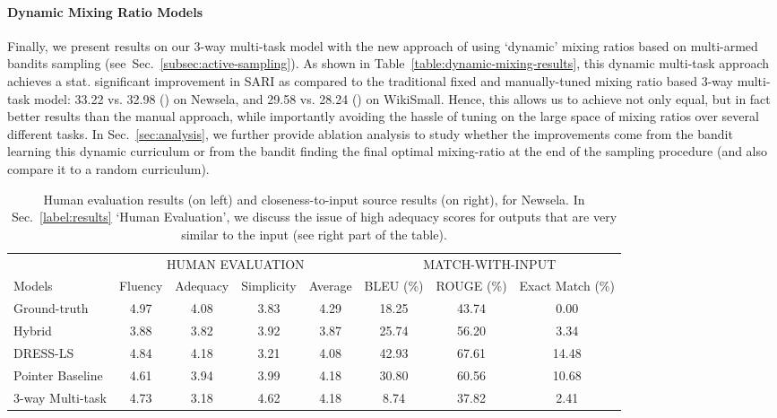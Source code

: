 \documentclass[11pt]{article}
\def\secref#1{Sec.~\ref{#1}}
\begin{document}
\paragraph{Dynamic Mixing Ratio Models}
Finally, we present results on our 3-way multi-task model with the new approach of using `dynamic' mixing ratios based on multi-armed bandits sampling (see~\secref{subsec:active-sampling}). As shown in Table~\ref{table:dynamic-mixing-results}, this dynamic multi-task approach achieves a stat. significant improvement in SARI  as compared to the traditional fixed and manually-tuned mixing ratio based 3-way multi-task model: 33.22 vs. 32.98 () on Newsela, and 29.58 vs. 28.24 () on WikiSmall. Hence, this allows us to achieve not only equal, but in fact better results than the manual approach, while importantly avoiding the hassle of tuning on the large space of mixing ratios over several different tasks. In Sec.~\ref{sec:analysis}, we further provide ablation analysis to study whether the improvements come from the bandit learning this dynamic curriculum or from the bandit finding the final optimal mixing-ratio at the end of the sampling procedure (and also compare it to a random curriculum).

\begin{table}[t]
\begin{center}
\begin{small}
\begin{tabular}{|l|c|c|c|c|||c|c|c|}
\hline
 & \multicolumn{4}{c|||}{HUMAN EVALUATION} & \multicolumn{3}{c|}{MATCH-WITH-INPUT} \\
Models & Fluency & Adequacy & Simplicity & Average & BLEU (\%) & ROUGE (\%) & Exact Match (\%) \\
\hline
Ground-truth & 4.97 & 4.08 & 3.83 & 4.29 & 18.25 & 43.74 & 0.00 \\
\hdashline
Hybrid & 3.88 & 3.82 & 3.92 & 3.87 & 25.74 & 56.20 & 3.34 \\
DRESS-LS & 4.84 & 4.18 & 3.21 & 4.08 & 42.93 & 67.61 & 14.48 \\
Pointer Baseline & 4.61 & 3.94 & 3.99 & 4.18 & 30.80 & 60.56 & 10.68 \\
3-way Multi-task &  4.73 & 3.18 & 4.62 & 4.18 & 8.74 & 37.82 & 2.41 \\
\hline
\end{tabular}
\end{small}
\end{center}
\vspace{-10pt}
\caption{Human evaluation results (on left) and closeness-to-input source results (on right), for Newsela. In Sec.~\ref{label:results} `Human Evaluation', we discuss the issue of high adequacy scores for outputs that are very similar to the input (see right part of the table).
}
\vspace{-7pt}
\label{table:newsela-human-eval}
\end{table}
\end{document}
